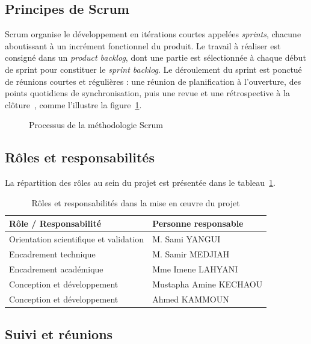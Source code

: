 \subsection{Principes de Scrum}

Scrum organise le développement en itérations courtes appelées \emph{sprints}, chacune aboutissant à un incrément fonctionnel du produit. Le travail à réaliser est consigné dans un \emph{product backlog}, dont une partie est sélectionnée à chaque début de sprint pour constituer le \emph{sprint backlog}. Le déroulement du sprint est ponctué de réunions courtes et régulières : une réunion de planification à l'ouverture, des points quotidiens de synchronisation, puis une revue et une rétrospective à la clôture~\cite{schwaber2001agile}, comme l'illustre la figure~\ref{fig:scrum}.

\begin{figure}[H]
    \centering
    \caption{Processus de la méthodologie Scrum}
    \label{fig:scrum}
\end{figure}

\subsection{Rôles et responsabilités}

La répartition des rôles au sein du projet est présentée dans le tableau~\ref{tab:roles}.

\begin{table}[H]
    \centering
    \caption{Rôles et responsabilités dans la mise en œuvre du projet}
    \label{tab:roles}
    \begin{tabular}{p{6cm}p{7cm}}
        \toprule
        \textbf{Rôle / Responsabilité} & \textbf{Personne responsable} \\
        \midrule
        Orientation scientifique et validation & M. Sami YANGUI \\
        Encadrement technique & M. Samir MEDJIAH \\
        Encadrement académique & Mme Imene LAHYANI \\
        Conception et développement & Mustapha Amine KECHAOU \\
        Conception et développement & Ahmed KAMMOUN \\
        \bottomrule
    \end{tabular}
\end{table}

\subsection{Suivi et réunions}

